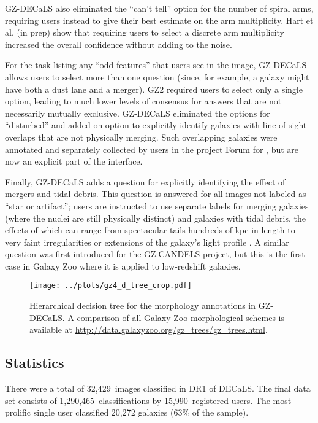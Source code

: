 \documentclass[iop,apj,tighten]{emulateapj}
\begin{document}
GZ-DECaLS also eliminated the ``can't tell'' option for the number of spiral arms, requiring users instead to give their best estimate on the arm multiplicity. Hart et al. (in prep) show that requiring users to select a discrete arm multiplicity increased the overall confidence without adding to the noise. 

For the task listing any ``odd features'' that users see in the image, GZ-DECaLS allows users to select more than one question (since, for example, a galaxy might have both a dust lane and a merger). GZ2 required users to select only a single option, leading to much lower levels of consensus for answers that are not necessarily mutually exclusive. GZ-DECaLS eliminated the options for ``disturbed'' \citep[dominated by pixel trails in GZ2;][]{wil13} and added on option to explicitly identify galaxies with line-of-sight overlaps that are not physically merging. Such overlapping galaxies were annotated and separately collected by users in the project Forum for \citet{kee13,kee14}, but are now an explicit part of the interface.

Finally, GZ-DECaLS adds a question for explicitly identifying the effect of mergers and tidal debris. This question is answered for all images not labeled as ``star or artifact''; users are instructed to use separate labels for merging galaxies (where the nuclei are still physically distinct) and galaxies with tidal debris, the effects of which can range from spectacular tails hundreds of kpc in length to very faint irregularities or extensions of the galaxy's light profile \citep{kav10,kav12}. A similar question was first introduced for the GZ:CANDELS project, but this is the first case in Galaxy Zoo where it is applied to low-redshift galaxies. 


\begin{figure*}
\centering
\texttt{[image: ../plots/gz4\_d\_tree\_crop.pdf]}
\caption{Hierarchical decision tree for the morphology annotations in GZ-DECaLS. A comparison of all Galaxy Zoo morphological schemes is available at \url{http://data.galaxyzoo.org/gz_trees/gz_trees.html}.\label{fig:decision_tree}}
\end{figure*}


\subsection{Statistics}

There were a total of 32,429~images classified in DR1 of DECaLS. The final data set consists of 1,290,465~classifications by 15,990~registered users. The most prolific single user classified 20,272 galaxies (63\% of the sample).
\end{document}

